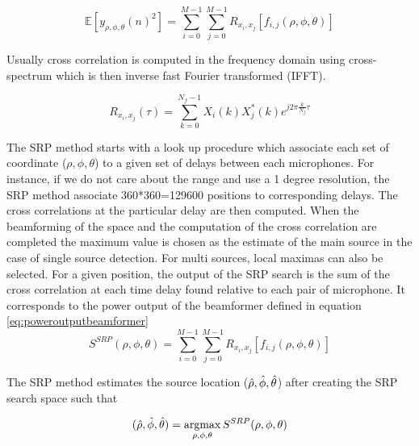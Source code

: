 \begin{equation}
    \mathbb{E}[{y_{\rho,\phi,\theta}(n)^2}]=\sum\limits_{i=0}^{M-1}\sum\limits_{j=0}^{M-1}{R_{x_i,x_j}[f_{i,j}(\rho,\phi,\theta)]} 
    \label{eq:poweroutputbeamformer}
\end{equation}

Usually cross correlation is computed in the frequency domain using cross-spectrum which is then inverse fast Fourier transformed (IFFT).

\begin{equation}
    R_{x_i,x_j}(\tau)= \sum\limits_{k=0}^{N_{f}-1}{X_{i}(k)X_{j}^*(k)e^{j2\pi\frac{k}{N_{f}}\tau}}
\end{equation}


The SRP method starts with a look up procedure which associate each set of coordinate ($\rho,\phi,\theta$) to a given set of delays between each microphones. For instance, if we do not care about the range and use a 1 degree resolution, the SRP method associate 360*360=129600 positions to corresponding delays. The cross correlations at the particular delay are then computed. When the beamforming of the space and the computation of the cross correlation are completed the maximum value is chosen as the estimate of the main source in the case of single source detection. For multi sources, local maximas can also be selected. For a given position, the output of the SRP search is the sum of the cross correlation at each time delay found relative to each pair of microphone. It corresponds to the power output of the beamformer defined in equation \ref{eq:poweroutputbeamformer}
\begin{equation}
    S^{SRP}(\rho,\phi,\theta)=\sum\limits_{i=0}^{M-1}\sum\limits_{j=0}^{M-1}{R_{x_i,x_j}[f_{i,j}(\rho,\phi,\theta)]}
\end{equation}

The SRP method estimates the source location ($\Hat{\rho},\hat{\phi},\hat{\theta}$) after creating the SRP search space such that

\begin{equation}
    (\Hat{\rho},\hat{\phi},\hat{\theta})=\argmax_{\rho,\phi,\theta}S^{SRP}(\rho,\phi,\theta)
\end{equation}


